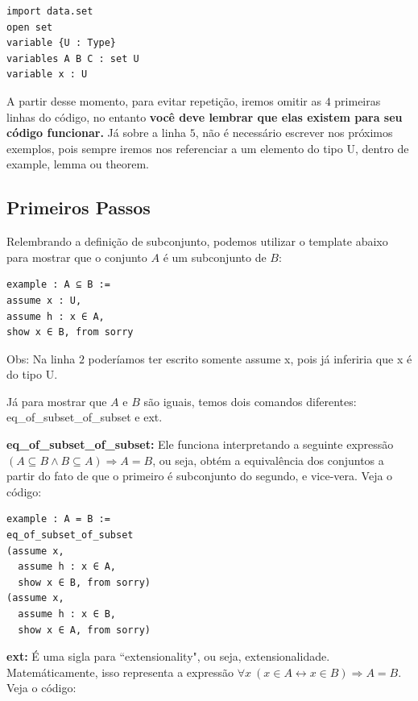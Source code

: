 \begin{lstlisting}
import data.set
open set
variable {U : Type}
variables A B C : set U
variable x : U \end{lstlisting}

A partir desse momento, para evitar repetição, iremos omitir as $4$ primeiras linhas do código, no entanto \textbf{você deve lembrar que elas existem para seu código funcionar.} Já sobre a linha $5$, não é necessário escrever nos próximos exemplos, pois sempre iremos nos referenciar a um elemento do tipo{ \selectfont U}, dentro de {\selectfont example, lemma} ou {\selectfont theorem}.

\subsection{Primeiros Passos}

Relembrando a definição de subconjunto, podemos utilizar o template abaixo para mostrar que o conjunto $A$ é um subconjunto de $B$:

\begin{lstlisting}
example : A ⊆ B :=
assume x : U,
assume h : x ∈ A,
show x ∈ B, from sorry \end{lstlisting}

Obs: Na linha $2$ poderíamos ter escrito somente {\selectfont assume x}, pois já inferiria que {\selectfont x} é do tipo {\selectfont U}.

Já para mostrar que $A$ e $B$ são iguais, temos dois comandos diferentes: {\selectfont eq\_of\_subset\_of\_subset} e {\selectfont ext}.

\textbf{eq\_of\_subset\_of\_subset:} Ele funciona interpretando a seguinte expressão $(A \subseteq B \wedge B \subseteq A) \Rightarrow A=B$, ou seja, obtém a equivalência dos conjuntos a partir do fato de que o primeiro é subconjunto do segundo, e vice-vera. Veja o código:

\begin{lstlisting}
example : A = B :=
eq_of_subset_of_subset
(assume x,
  assume h : x ∈ A,
  show x ∈ B, from sorry)
(assume x,
  assume h : x ∈ B,
  show x ∈ A, from sorry) \end{lstlisting}

\textbf{ext:} É uma sigla para ``extensionality", ou seja, extensionalidade. Matemáticamente, isso representa a expressão $\forall x \ (x \in A \leftrightarrow x \in B) \Rightarrow A=B$. Veja o código:

